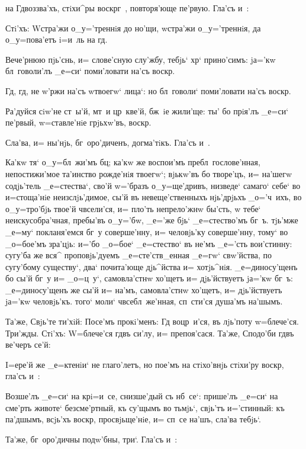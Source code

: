 
на Гд воззва'хъ, стiхи^ры воскр г~, повторя'юще 
пе'рвую. Гла'съ и~:

Стi'хъ: W\т стра'жи о_у='треннiя до но'щи, w\т стра'жи 
о_у='треннiя, да о_у=пова'етъ i=и~ль на гд.

Вече'рнюю пjь'снь, и= слове'сную слу'жбу, тебjь` 
хр` прино'симъ: jа='кw бл~говоли'лъ _е=си` 
поми'ловати на'съ воскр.

Гд, гд, не w'ржи на'съ w\т твоегw` лица`: но 
бл~говоли` поми'ловати на'съ воскр.

Ра'дуйся сiw'не ст~ы'й, мт~и цр~кве'й, бж~iе жили'ще: 
ты' бо прiя'лъ _е=си` пе'рвый, w=ставле'нiе грjьхw'въ, 
воскр.

Сла'ва, и= ны'нjь, бг~оро'диченъ, догма'тiкъ. Гла'съ 
и~.

Ка'кw тя` о_у=бл~жи'мъ бц; ка'кw же воспои'мъ 
пребл~гослове'нная, непостижи'мое та'инство рожде'нiя 
твоегw`; вjькw'въ бо творе'цъ, и= на'шегw содjь'тель 
_е=стества`, сво'й w='бразъ о_у=ще'дривъ, низведе` 
самаго` себе` во и=стоща'нiе неизслjь'димое, сы'й въ 
невеще'ственныхъ нjь'дрjьхъ _о='ч~ихъ, во о_у=тро'бjь 
твое'й ч всели'ся, и= пло'ть непрело'жнw бы'сть, w\т 
тебе` неискусобра'чная, пребы'въ о_у='бw, _е='же бjь` 
_е=стество'мъ бг~ъ. тjь'мже _е=му` покланя'емся бг~у 
соверше'нну, и= человjь'ку соверше'нну, тому` во 
_о=бое'мъ зра'цjь: и='бо _о=бое` _е=стество` въ не'мъ 
_е='сть вои'стинну: сугу'ба же вся^ проповjь'дуемъ 
_е=сте'ств_енная _е=гw` свw'йства, по сугу'бому 
существу`, два` почита'юще дjь^йства и= хотjь^нiя. 
_е=диносу'щенъ бо сы'й бг~у и= _о=ц~у`, самовла'стнw 
хо'щетъ и= дjь'йствуетъ jа='кw бг~ъ: _е=диносу'щенъ же 
сы'й и= на'мъ, самовла'стнw хо'щетъ, и= дjь'йствуетъ 
jа='кw человjь'къ. того` моли` ч всебл~же'нная, 
сп~сти'ся душа'мъ на'шымъ.

Та'же, Свjь'те ти'хiй: Посе'мъ прокi'менъ: Гд 
воцр~и'ся, въ лjь'поту w=блече'ся. Три'жды. Стi'хъ: 
W=блече'ся гд въ си'лу, и= препоя'сася. Та'же, 
Сподо'би гд въ ве'черъ се'й:

I=ере'й же _е=ктенiи` не глаго'летъ, но пое'мъ на 
стiхо'внjь стiхи'ру воскр, гла'съ и~:

Возше'лъ _е=си` на кр i=и~се, снизше'дый съ 
нб~се`: прише'лъ _е=си` на сме'рть животе` безсме'ртный, 
къ су'щымъ во тьмjь`, свjь'тъ и='стинный: къ па'дшымъ, 
всjь'хъ воскр, просвjьще'нiе, и= сп~се на'шъ, сла'ва 
тебjь`.

Та'же, бг~оро'дичны подw'бны, три`. Гла'съ и~:

